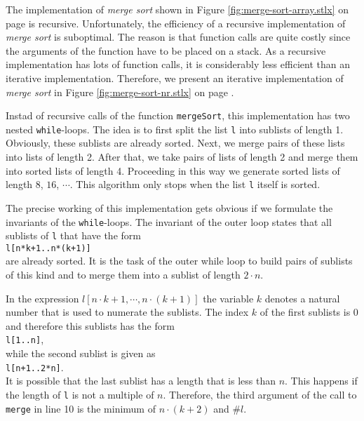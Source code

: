\noindent
The implementation of \emph{merge sort} shown in Figure \ref{fig:merge-sort-array.stlx} on page
\pageref{fig:merge-sort-array.stlx} is recursive.  Unfortunately, the efficiency of a recursive
implementation of \emph{merge sort} is suboptimal.  The reason is that function calls are quite
costly since the arguments of the function have to be placed on a stack.  As a recursive
implementation has lots of function calls, it is considerably less efficient than an iterative
implementation.  Therefore, we present an iterative implementation of \emph{merge sort} in Figure
\ref{fig:merge-sort-nr.stlx} on page \pageref{fig:merge-sort-nr.stlx}.

Instad of recursive calls of the function \texttt{mergeSort}, this implementation has two nested 
\texttt{while}-loops.  The idea is to first split the list \texttt{l} into sublists of length 1.
Obviously, these sublists are already sorted.  Next, we merge pairs of these lists into lists of
length 2.  After that, we take pairs of lists of length 2 and merge them into sorted lists of length
4. Proceeding in this way we generate sorted lists of length
$8$, $16$, $\cdots$.  This algorithm only stops when the list \texttt{l} itself is sorted.

The precise working of this implementation gets obvious if we formulate the invariants of the
\texttt{while}-loops.  The invariant of the outer loop states that all sublists of \texttt{l} 
that have the form
\\[0.2cm]
\hspace*{1.3cm}
\texttt{l[n*k+1..n*(k+1)]}
\\[0.2cm]
are already sorted.  It is the task of the outer while loop to build pairs of sublists of this kind
and to merge them into a sublist of length $2 \cdot n$.

In the expression $l[n \cdot k + 1, \cdots, n \cdot (k+1)]$ the variable $k$ denotes a natural
number that is used to numerate the sublists.  The index $k$ of the first sublists is $0$ and
therefore this sublists has the form
\\[0.2cm]
\hspace*{1.3cm}
\texttt{l[1..n]},
\\[0.2cm]
while the second sublist is given as
\\[0.2cm]
\hspace*{1.3cm}
\texttt{l[n+1..2*n]}.
\\[0.2cm]
It is possible that the last sublist has a length that is less than $n$.  This happens if the length
of \texttt{l} is not a multiple of $n$.  Therefore, the third argument of the call to \texttt{merge}
in line 10 is the minimum of $n\cdot(k+2)$ and $\mathtt{\#}l$.

